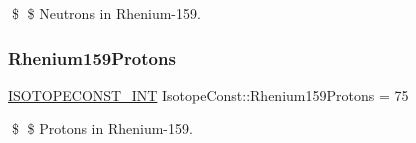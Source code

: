 \$ \$ Neutrons in Rhenium-\/159. \mbox{\label{group___isotope_const-_rhenium-_re159_gad7e011778a1c152945033bc6889b5ec6}} 
\subsubsection{\texorpdfstring{Rhenium159\+Protons}{Rhenium159Protons}}
{\footnotesize\ttfamily \mbox{\hyperlink{group___isotope_const-_macros_ga5f18360b3e99483a35c32d789e62621c}{I\+S\+O\+T\+O\+P\+E\+C\+O\+N\+S\+T\+\_\+\+I\+NT}} Isotope\+Const\+::\+Rhenium159\+Protons = 75}

\$ \$ Protons in Rhenium-\/159. 